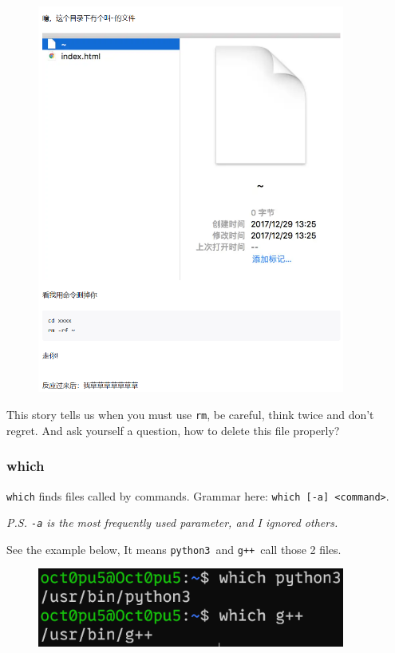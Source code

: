 \documentclass[12pt]{ctexart}
\begin{document}
\begin{figure}[H]
    \centering
    \includegraphics[width=0.9\textwidth,keepaspectratio]{assets/Linux/1.5 Linux file commands/6.png}
\end{figure}

This story tells us when you must use \texttt{rm}, be careful, think
twice and don't regret. And ask yourself a question, how
to delete this file properly?

\subsubsection{\textbf{which}}

\texttt{which} finds files called by commands. Grammar here:
\texttt{which\ {[}-a{]}\ \textless{}command\textgreater{}}.

\emph{P.S. \texttt{-a} is the most frequently used parameter, and I
ignored others.}

See the example below, It means \texttt{python3}\ and \texttt{g++}\ call
those 2 files.

\begin{figure}[H]
    \centering
    \includegraphics[width=0.9\textwidth,keepaspectratio]{assets/Linux/1.5 Linux file commands/7.png}
\end{figure}
\end{document}

